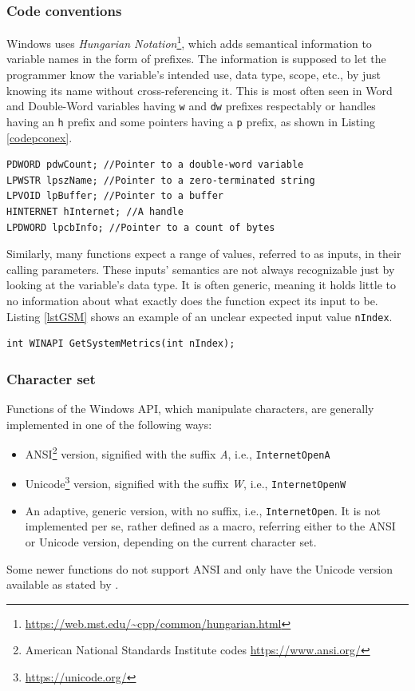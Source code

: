 \subsubsection{Code conventions}
\label{winapicodeconventions}
Windows uses \textit{Hungarian Notation}\footnote{\url{https://web.mst.edu/~cpp/common/hungarian.html}}, which adds semantical information to variable names in the form of prefixes.\cite{WinConventions} The information is supposed to let the programmer know the variable's intended use, data type, scope, etc., by just knowing its name without cross-referencing it. This is most often seen in Word and Double-Word variables having \lstinline{w} and \lstinline{dw} prefixes respectably or handles having an \lstinline{h} prefix and some pointers having a \lstinline{p} prefix, as shown in Listing \ref{codepconex}.
\begin{lstlisting}[caption={An example of hungarian notation}, label=codepconex]
PDWORD pdwCount; //Pointer to a double-word variable
LPWSTR lpszName; //Pointer to a zero-terminated string
LPVOID lpBuffer; //Pointer to a buffer
HINTERNET hInternet; //A handle
LPDWORD lpcbInfo; //Pointer to a count of bytes
\end{lstlisting}

Similarly, many functions expect a range of values, referred to as inputs, in their calling parameters. These inputs' semantics are not always recognizable just by looking at the variable's data type. It is often generic, meaning it holds little to no information about what exactly does the function expect its input to be. Listing \ref{lstGSM} shows an example of an unclear expected input value \lstinline{nIndex}.
\begin{lstlisting}[caption={The prototype of the GetSystemMetrics function. Source:\ cite{WinGetSM}},label=lstGSM]
int WINAPI GetSystemMetrics(int nIndex);
\end{lstlisting}

\subsubsection{Character set}
Functions of the Windows API, which manipulate characters, are generally implemented in one of the following ways:
\begin{itemize}
    \item ANSI\footnote{American National Standards Institute codes \url{https://www.ansi.org/}} version, signified with the suffix \textit{A}, i.e., \lstinline{InternetOpenA}
    \item Unicode\footnote{\url{https://unicode.org/}} version, signified with the suffix \textit{W}, i.e., \lstinline{InternetOpenW}
    \item An adaptive, generic version, with no suffix, i.e., \lstinline{InternetOpen}. It is not implemented per se, rather defined as a macro, referring either to the ANSI or Unicode version, depending on the current character set.
\end{itemize}
Some newer functions do not support ANSI and only have the Unicode version available as stated by \cite{WinUnicode}.

